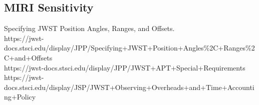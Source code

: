 \subsection{MIRI Sensitivity}

\smallskip \smallskip
\noindent
Specifying JWST Position Angles, Ranges, and Offsets.\\
https://jwst-docs.stsci.edu/display/JPP/Specifying+JWST+Position+Angles\%2C+Ranges\%2C+and+Offsets\\
https://jwst-docs.stsci.edu/display/JPP/JWST+APT+Special+Requirements\\


https://jwst-docs.stsci.edu/display/JSP/JWST+Observing+Overheads+and+Time+Accounting+Policy





